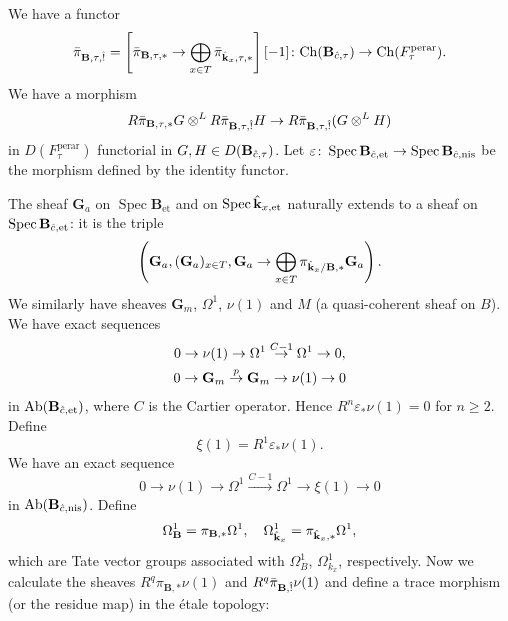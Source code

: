 \documentclass{amsart}
\theoremstyle{remark}
\numberwithin{equation}{subsection}
\newcommand{\tensor}{\mathbin{\otimes}}
\newcommand{\et}{\mathrm{et}}
\newcommand{\Gm}{\mathbf{G}_{m}}
\newcommand{\Ga}{\mathbf{G}_{a}}
\newcommand{\perar}{\mathrm{perar}}
\newcommand{\alg}[1]{\mathbf{#1}}
\newcommand{\Ch}{\mathrm{Ch}}
\newcommand{\nis}{\mathrm{nis}}
\DeclareMathOperator{\Spec}{Spec}
\DeclareMathOperator{\Ab}{Ab}
\begin{document}
We have a functor
	\[
			\Bar{\pi}_{\alg{B}, \tau, \Hat{!}}
		=
			\left[
					\Bar{\pi}_{\alg{B}, \tau, \ast}
				\to
					\bigoplus_{x \in T}
						\Bar{\pi}_{\Hat{\alg{k}}_{x}, \tau, \ast}
			\right][-1]
		\colon
			\Ch(\alg{B}_{\Hat{c}, \tau})
		\to
			\Ch(F^{\perar}_{\tau}).
	\]
We have a morphism
	\begin{equation} \label{0342}
				R \Bar{\pi}_{\alg{B}, \tau, \ast} G
			\tensor^{L}
				R \Bar{\pi}_{\alg{B}, \tau, \Hat{!}} H
		\to
			R \Bar{\pi}_{\alg{B}, \tau, \Hat{!}}(G \tensor^{L} H)
	\end{equation}
in $D(F^{\perar}_{\tau})$ functorial in $G, H \in D(\alg{B}_{\Hat{c}, \tau})$.
Let $\varepsilon \colon \Spec \alg{B}_{\Hat{c}, \et} \to \Spec \alg{B}_{\Hat{c}, \nis}$
be the morphism defined by the identity functor.

The sheaf $\Ga$ on $\Spec \alg{B}_{\et}$ and on $\Spec \Hat{\alg{k}}_{x, \et}$ naturally extends to
a sheaf on $\Spec \alg{B}_{\Hat{c}, \et}$:
it is the triple
	\[
		\left(
			\Ga,
			(\Ga)_{x \in T},
				\Ga
			\to
				\bigoplus_{x \in T}
					\pi_{\Hat{\alg{k}}_{x} / \alg{B}, \ast} \Ga
		\right).
	\]
We similarly have sheaves $\Gm$, $\Omega^{1}$, $\nu(1)$ and $M$ (a quasi-coherent sheaf on $B$).
We have exact sequences
	\begin{gather} \label{0484}
				0
			\to
				\nu(1)
			\to
				\Omega^{1}
			\stackrel{C - 1}{\to}
				\Omega^{1}
			\to
				0,
		\\ \notag
				0
			\to
				\Gm
			\stackrel{p}{\to}
				\Gm
			\to
				\nu(1)
			\to
				0
	\end{gather}
in $\Ab(\alg{B}_{\Hat{c}, \et})$, where $C$ is the Cartier operator.
Hence $R^{n} \varepsilon_{\ast} \nu(1) = 0$ for $n \ge 2$.
Define
	\[
			\xi(1)
		=
			R^{1} \varepsilon_{\ast} \nu(1).
	\]
We have an exact sequence
	\begin{equation} \label{0337}
			0
		\to
			\nu(1)
		\to
			\Omega^{1}
		\stackrel{C - 1}{\to}
			\Omega^{1}
		\to
			\xi(1)
		\to
			0
	\end{equation}
in $\Ab(\alg{B}_{\Hat{c}, \nis})$.
Define
	\[
			\Omega_{\alg{B}}^{1}
		=
			\pi_{\alg{B}, \ast} \Omega^{1},
		\quad
			\Omega_{\Hat{\alg{k}}_{x}}^{1}
		=
			\pi_{\Hat{\alg{k}}_{x}, \ast} \Omega^{1},
	\]
which are Tate vector groups associated with
$\Omega_{B}^{1}$, $\Omega_{k_{x}}^{1}$, respectively.
Now we calculate the sheaves
$R^{q} \pi_{\alg{B}, \ast} \nu(1)$ and $R^{q} \Bar{\pi}_{\alg{B}, \Hat{!}} \nu(1)$
and define a trace morphism (or the residue map) in the \'etale topology:
\end{document}
